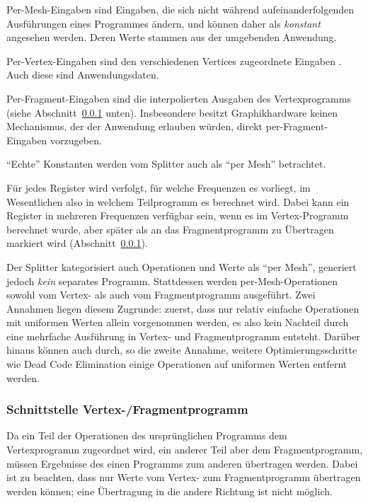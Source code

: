 \documentclass[twoside,a4paper,fleqn,12pt]{article}
\begin{document}
Per-Mesh-Eingaben sind Eingaben, die sich nicht während aufeinanderfolgenden Ausführungen eines Programmes
ändern, und können daher als \emph{konstant} angesehen werden. Deren Werte stammen aus der umgebenden Anwendung.

Per-Vertex-Eingaben sind den verschiedenen Vertices zugeordnete Eingaben . %
Auch diese sind Anwendungsdaten.

Per-Fragment-Eingaben sind die interpolierten Ausgaben des Vertexprogramms (siehe Abschnitt~\ref{schnittstelle} unten). 
Insbesondere besitzt Graphikhardware keinen Mechanismus, der der Anwendung erlauben würden, direkt per-Fragment-Eingaben
vorzugeben.

"`Echte"' Konstanten werden vom Splitter auch als "`per Mesh"' betrachtet.

Für jedes Register wird verfolgt, für welche Frequenzen es vorliegt, im Wesentlichen also in welchem Teilprogramm es berechnet wird.
Dabei kann ein Register in mehreren Frequenzen verfügbar sein, wenn es im Vertex-Programm berechnet wurde, aber später als
an das Fragmentprogramm zu Übertragen markiert wird (Abschnitt~\ref{schnittstelle}).

Der Splitter kategorisiert auch Operationen und Werte als "`per Mesh"', generiert jedoch \emph{kein} separates Programm.
Stattdessen werden per-Mesh-Operationen sowohl vom Vertex- als auch vom Fragmentprogramm ausgeführt. Zwei Annahmen
liegen diesem Zugrunde: zuerst, dass nur relativ einfache Operationen mit uniformen Werten allein vorgenommen werden, es also kein
Nachteil durch eine mehrfache Ausführung in Vertex- und Fragmentprogramm entsteht. Darüber hinaus können auch durch, so die zweite Annahme,
weitere Optimierungsschritte wie Dead Code Elimination einige Operationen auf uniformen Werten entfernt werden.


\subsubsection{Schnittstelle Vertex-/Fragmentprogramm}
\label{schnittstelle}

Da ein Teil der Operationen des ursprünglichen Programms dem Vertexprogramm zugeordnet wird, ein anderer Teil aber dem
Fragmentprogramm, müssen Ergebnisse des einen Programms zum anderen übertragen werden.
Dabei ist zu beachten, dass nur Werte vom Vertex- zum Fragmentprogramm übertragen werden können; %
eine Übertragung in die andere Richtung ist nicht möglich.
\end{document}
